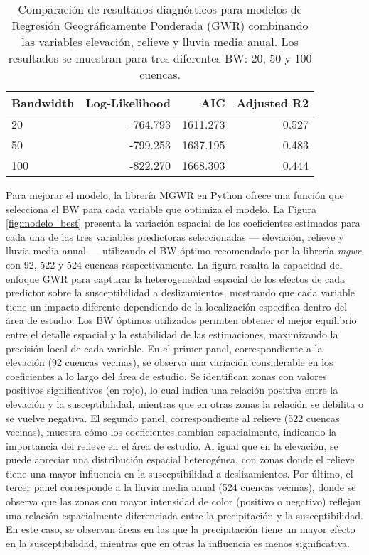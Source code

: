 \documentclass[
  manuscript=article,  
  layout=preprint,  
]{format}
\begin{document}
\begin{table}
\caption{Comparación de resultados diagnósticos para modelos de Regresión Geográficamente Ponderada (GWR) combinando las variables elevación, relieve y lluvia media anual. Los resultados se muestran para tres diferentes BW: 20, 50 y 100 cuencas.}
\label{tab:comparison_results}
\begin{tabular}{lrrr}
\toprule
Bandwidth & Log-Likelihood & AIC & Adjusted R2 \\
\midrule
20 & -764.793 & 1611.273 & 0.527 \\
50 & -799.253 & 1637.195 & 0.483 \\
100 & -822.270 & 1668.303 & 0.444 \\
\bottomrule
\end{tabular}
\end{table}

Para mejorar el modelo, la librería MGWR en Python ofrece una función que selecciona el BW para cada variable que optimiza el modelo. La Figura \ref{fig:modelo_best} presenta la variación espacial de los coeficientes estimados para cada una de las tres variables predictoras seleccionadas — elevación, relieve y lluvia media anual — utilizando el BW óptimo recomendado por la librería \textit{mgwr} con 92, 522 y 524 cuencas respectivamente. La figura resalta la capacidad del enfoque GWR para capturar la heterogeneidad espacial de los efectos de cada predictor sobre la susceptibilidad a deslizamientos, mostrando que cada variable tiene un impacto diferente dependiendo de la localización específica dentro del área de estudio. Los BW óptimos utilizados permiten obtener el mejor equilibrio entre el detalle espacial y la estabilidad de las estimaciones, maximizando la precisión local de cada variable. En el primer panel, correspondiente a la elevación (92 cuencas vecinas), se observa una variación considerable en los coeficientes a lo largo del área de estudio. Se identifican zonas con valores positivos significativos (en rojo), lo cual indica una relación positiva entre la elevación y la susceptibilidad, mientras que en otras zonas la relación se debilita o se vuelve negativa. El segundo panel, correspondiente al relieve (522 cuencas vecinas), muestra cómo los coeficientes cambian espacialmente, indicando la importancia del relieve en el área de estudio. Al igual que en la elevación, se puede apreciar una distribución espacial heterogénea, con zonas donde el relieve tiene una mayor influencia en la susceptibilidad a deslizamientos. Por último, el tercer panel corresponde a la lluvia media anual (524 cuencas vecinas), donde se observa que las zonas con mayor intensidad de color (positivo o negativo) reflejan una relación espacialmente diferenciada entre la precipitación y la susceptibilidad. En este caso, se observan áreas en las que la precipitación tiene un mayor efecto en la susceptibilidad, mientras que en otras la influencia es menos significativa.
\end{document}
